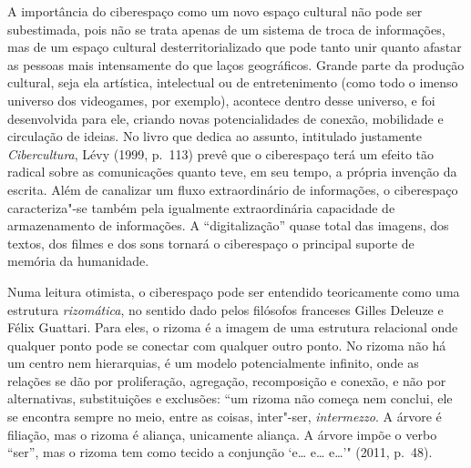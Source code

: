 A importância do ciberespaço como um novo espaço cultural não pode ser
subestimada, pois não se trata apenas de um sistema de troca de
informações, mas de um espaço cultural desterritorializado que pode tanto
unir quanto afastar as pessoas mais intensamente do que laços %
geográficos. Grande parte da produção cultural, seja ela artística,
intelectual ou de entretenimento (como todo o imenso universo dos
videogames, por exemplo), acontece dentro desse universo, e foi
desenvolvida para ele, criando novas potencialidades de conexão,
mobilidade e circulação de ideias. No livro que dedica ao assunto,
intitulado justamente \emph{Cibercultura}, Lévy (1999, p.~113) prevê que
o ciberespaço terá um efeito tão radical sobre as comunicações quanto
teve, em seu tempo, a própria invenção da escrita. Além de canalizar um
fluxo extraordinário de informações, o ciberespaço caracteriza"-se também
pela igualmente extraordinária capacidade de armazenamento de
informações. A ``digitalização'' quase total das imagens, dos textos,
dos filmes e dos sons tornará o ciberespaço o principal suporte de
memória da humanidade.

Numa leitura otimista, o ciberespaço pode ser entendido teoricamente
como uma estrutura \emph{rizomática}, no sentido dado pelos filósofos
franceses Gilles Deleuze e Félix Guattari. Para eles, o
rizoma é a imagem de uma estrutura relacional onde qualquer ponto pode
se conectar com qualquer outro ponto. No rizoma não há um centro nem
hierarquias, é um modelo potencialmente infinito, onde as relações se
dão por proliferação, agregação, recomposição e conexão, e não por
alternativas, substituições e exclusões: ``um rizoma não começa nem
conclui, ele se encontra sempre no meio, entre as coisas, inter"-ser,
\emph{intermezzo}. A árvore é filiação, mas o rizoma é aliança,
unicamente aliança. A árvore impõe o verbo ``ser'', mas o rizoma tem
como tecido a conjunção `e\ldots{} e\ldots{} e\ldots{}'" (2011, p.~48).


